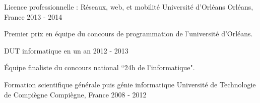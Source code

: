 \begin{cventries}
  \cventry
    {Licence professionnelle : Réseaux, web, et mobilité}
    {Université d'Orléans}
    {Orléans, France}
    {2013 - 2014}
    {
      \begin{cvitems}
        \item {Premier prix en équipe du concours de programmation de l'université d'Orléans.}
      \end{cvitems}
      \vspace{-2.0mm}
    }
  \cventry
    {DUT informatique en un an}
    {}
    {}
    {2012 - 2013}
    {
      \begin{cvitems}
        \item {Équipe finaliste du concours national ``24h de l'informatique".}
      \end{cvitems}
    }
  \cventry
    {Formation scientifique générale puis génie informatique}
    {Université de Technologie de Compiègne}
    {Compiègne, France}
    {2008 - 2012}
    {}
\end{cventries}
